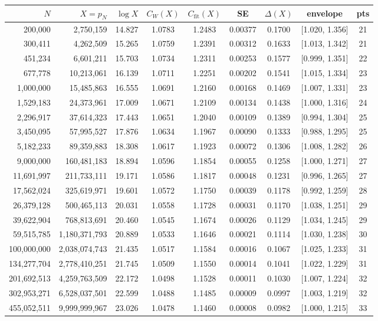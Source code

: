 \begin{tabular}{rrrcccccc}
\toprule
$N$ & $X=p_N$ & $\log X$ & $C_W(X)$ & $C_{\mathrm{fit}}(X)$ & SE & $\Delta(X)$ & envelope & pts \\
\midrule
200{,}000 & 2{,}750{,}159 & 14.827 & 1.0783 & 1.2483 & 0.00377 & 0.1700 & [1.020, 1.356] & 21 \\
300{,}411 & 4{,}262{,}509 & 15.265 & 1.0759 & 1.2391 & 0.00312 & 0.1633 & [1.013, 1.342] & 21 \\
451{,}234 & 6{,}601{,}211 & 15.703 & 1.0734 & 1.2311 & 0.00253 & 0.1577 & [0.999, 1.351] & 22 \\
677{,}778 & 10{,}213{,}061 & 16.139 & 1.0711 & 1.2251 & 0.00202 & 0.1541 & [1.015, 1.334] & 23 \\
1{,}000{,}000 & 15{,}485{,}863 & 16.555 & 1.0691 & 1.2160 & 0.00168 & 0.1469 & [1.007, 1.331] & 23 \\
1{,}529{,}183 & 24{,}373{,}961 & 17.009 & 1.0671 & 1.2109 & 0.00134 & 0.1438 & [1.000, 1.316] & 24 \\
2{,}296{,}917 & 37{,}614{,}323 & 17.443 & 1.0651 & 1.2040 & 0.00109 & 0.1389 & [0.994, 1.304] & 25 \\
3{,}450{,}095 & 57{,}995{,}527 & 17.876 & 1.0634 & 1.1967 & 0.00090 & 0.1333 & [0.988, 1.295] & 25 \\
5{,}182{,}233 & 89{,}359{,}883 & 18.308 & 1.0617 & 1.1923 & 0.00072 & 0.1306 & [1.008, 1.282] & 26 \\
9{,}000{,}000 & 160{,}481{,}183 & 18.894 & 1.0596 & 1.1854 & 0.00055 & 0.1258 & [1.000, 1.271] & 27 \\
11{,}691{,}997 & 211{,}733{,}111 & 19.171 & 1.0586 & 1.1817 & 0.00048 & 0.1231 & [0.996, 1.265] & 27 \\
17{,}562{,}024 & 325{,}619{,}971 & 19.601 & 1.0572 & 1.1750 & 0.00039 & 0.1178 & [0.992, 1.259] & 28 \\
26{,}379{,}128 & 500{,}465{,}113 & 20.031 & 1.0558 & 1.1728 & 0.00031 & 0.1170 & [1.038, 1.251] & 29 \\
39{,}622{,}904 & 768{,}813{,}691 & 20.460 & 1.0545 & 1.1674 & 0.00026 & 0.1129 & [1.034, 1.245] & 29 \\
59{,}515{,}785 & 1{,}180{,}371{,}793 & 20.889 & 1.0533 & 1.1646 & 0.00021 & 0.1114 & [1.030, 1.238] & 30 \\
100{,}000{,}000 & 2{,}038{,}074{,}743 & 21.435 & 1.0517 & 1.1584 & 0.00016 & 0.1067 & [1.025, 1.233] & 31 \\
134{,}277{,}704 & 2{,}778{,}410{,}251 & 21.745 & 1.0509 & 1.1550 & 0.00014 & 0.1041 & [1.022, 1.229] & 31 \\
201{,}692{,}513 & 4{,}259{,}763{,}509 & 22.172 & 1.0498 & 1.1528 & 0.00011 & 0.1030 & [1.007, 1.224] & 32 \\
302{,}953{,}271 & 6{,}528{,}037{,}501 & 22.599 & 1.0488 & 1.1485 & 0.00009 & 0.0997 & [1.003, 1.219] & 32 \\
455{,}052{,}511 & 9{,}999{,}999{,}967 & 23.026 & 1.0478 & 1.1460 & 0.00008 & 0.0982 & [1.000, 1.215] & 33 \\
\bottomrule
\end{tabular}